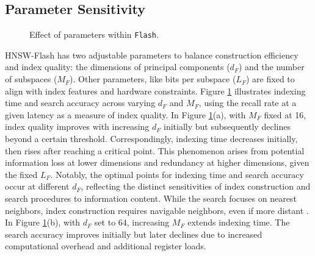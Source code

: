 \subsection{Parameter Sensitivity}
\label{subsec: param sensitivity}

\begin{figure}
  \setlength{\abovecaptionskip}{0cm}
  \setlength{\belowcaptionskip}{0cm}
  \centering
  \footnotesize
  \hspace{0.15cm}
  \newline
  \caption{Effect of parameters within \texttt{Flash}.}
  \label{fig: HNSW-Flash param}
  \vspace{-0.3cm}
\end{figure}

HNSW-Flash has two adjustable parameters to balance construction efficiency and index quality: the dimensions of principal components ($d_F$) and the number of subspaces ($M_F$). Other parameters, like bits per subspace ($L_F$) are fixed to align with index features and hardware constraints.
Figure \ref{fig: HNSW-Flash param} illustrates indexing time and search accuracy across varying $d_F$ and $M_F$, using the recall rate at a given latency as a measure of index quality. In Figure \ref{fig: HNSW-Flash param}(a), with $M_F$ fixed at 16, index quality improves with increasing $d_F$ initially but subsequently declines beyond a certain threshold. Correspondingly, indexing time decreases initially, then rises after reaching a critical point. This phenomenon arises from potential information loss at lower dimensions and redundancy at higher dimensions, given the fixed $L_F$. Notably, the optimal points for indexing time and search accuracy occur at different $d_F$, reflecting the distinct sensitivities of index construction and search procedures to information content. While the search focuses on nearest neighbors, index construction requires navigable neighbors, even if more distant \cite{HNSW,NSG}.
In Figure \ref{fig: HNSW-Flash param}(b), with $d_F$ set to 64, increasing $M_F$ extends indexing time. The search accuracy improves initially but later declines due to increased computational overhead and additional register loads.